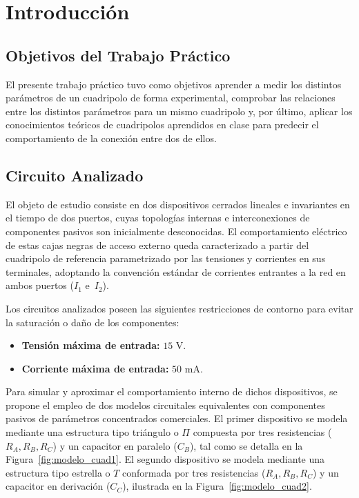 \section{Introducción}

\subsection{Objetivos del Trabajo Práctico}
El presente trabajo práctico tuvo como objetivos aprender a medir los distintos parámetros de un cuadripolo de forma experimental, comprobar las relaciones entre los distintos parámetros para un mismo cuadripolo y, por último, aplicar los conocimientos teóricos de cuadripolos aprendidos en clase para predecir el comportamiento de la conexión entre dos de ellos.

\subsection{Circuito Analizado}
El objeto de estudio consiste en dos dispositivos cerrados lineales e invariantes en el tiempo de dos puertos, cuyas topologías internas e interconexiones de componentes pasivos son inicialmente desconocidas. El comportamiento eléctrico de estas cajas negras de acceso externo queda caracterizado a partir del cuadripolo de referencia parametrizado por las tensiones y corrientes en sus terminales, adoptando la convención estándar de corrientes entrantes a la red en ambos puertos ($I_1$ e~$I_2$). 

Los circuitos analizados poseen las siguientes restricciones de contorno para evitar la saturación o daño de los componentes:
\begin{itemize}
    \item \textbf{Tensión máxima de entrada:} $15\text{ V}$.
    \item \textbf{Corriente máxima de entrada:} $50\text{ mA}$.
\end{itemize}

Para simular y aproximar el comportamiento interno de dichos dispositivos, se propone el empleo de dos modelos circuitales equivalentes con componentes pasivos de parámetros concentrados comerciales. El primer dispositivo se modela mediante una estructura tipo triángulo o $\Pi$ compuesta por tres resistencias ($R_A, R_B, R_C$) y un capacitor en paralelo ($C_B$), tal como se detalla en la Figura~\ref{fig:modelo_cuad1}. El segundo dispositivo se modela mediante una estructura tipo estrella o $T$ conformada por tres resistencias ($R_A, R_B, R_C$) y un capacitor en derivación ($C_C$), ilustrada en la Figura~\ref{fig:modelo_cuad2}.

